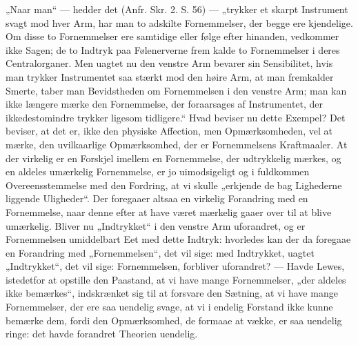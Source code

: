 \documentclass[11pt]{book}
\newcommand{\opage}[1]{\marginnote{\footnotesize\textit{[#1]}}}
\begin{document}
„Naar man“ --- hedder det (Anfr. Skr. 2. S. 56) --- „trykker et
skarpt Instrument svagt mod hver Arm, har man to adskilte
Fornemmelser, der begge ere kjendelige. Om disse to Fornemmelser ere
samtidige eller følge efter hinanden, vedkommer ikke Sagen; de to
Indtryk paa Følenerverne frem\-%
\opage{375} \setcounter{footnote}{0}%
kalde to Fornemmelser i deres Centralorganer. Men uagtet nu den
venstre Arm bevarer sin Sensibilitet, hvis man trykker Instrumentet
saa stærkt mod den høire Arm, at man fremkalder Smerte, taber man
Bevidstheden om Fornemmelsen i den venstre Arm; man kan ikke længere
mærke den Fornemmelse, der foraarsages af Instrumentet, der
ikkedestomindre trykker ligesom tidligere.“ Hvad beviser nu dette
Exempel? Det beviser, at det er, ikke den physiske Affection, men
Opmærksomheden, vel at mærke, den uvilkaarlige Opmærksomhed, der er
Fornemmelsens Kraftmaaler. At der virkelig er en Forskjel imellem en
Fornemmelse, der udtrykkelig mærkes, og en aldeles umærkelig
Fornemmelse, er jo uimodsigeligt og i fuldkommen Overeensstemmelse
med den Fordring, at vi skulle „erkjende de bag Lighederne liggende
Uligheder“. Der foregaaer altsaa en virkelig Forandring med en
Fornemmelse, naar denne efter at have været mærkelig gaaer over til
at blive umærkelig. Bliver nu „Indtrykket“ i den venstre Arm
uforandret, og er Fornemmelsen umiddelbart Eet med dette Indtryk:
hvorledes kan der da foregaae en Forandring med „Fornemmelsen“, det
vil sige: med Indtrykket, uagtet „Indtrykket“, det vil sige:
Fornemmelsen, forbliver uforandret? --- Havde Lewes, istedetfor at
opstille den Paastand, at vi have mange Fornemmelser, „der aldeles
ikke bemærkes“, indskrænket sig til at forsvare den Sætning, at vi
have mange Fornemmelser, der ere saa uendelig svage, at vi i endelig
Forstand ikke kunne bemærke dem, fordi den Opmærksomhed, de formaae
at vække, er saa uendelig ringe: det havde forandret Theorien
uendelig.
\end{document}
